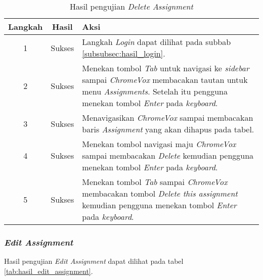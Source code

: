 \begin{table}[H]
	\centering
	\caption{Hasil pengujian \textit{Delete Assignment}}
	\label{tab:hasil_delete_assignment}
	\begin{tabular}{|c|c|p{12cm}|}
		\toprule
		Langkah & Hasil & Aksi\\
		\midrule
		1 & Sukses & Langkah \textit{Login} dapat dilihat pada subbab \ref{subsubsec:hasil_login}.\\
		2 & Sukses & Menekan tombol \textit{Tab} untuk navigasi ke \textit{sidebar} sampai \textit{ChromeVox} membacakan tautan untuk menu \textit{Assignments}. Setelah itu pengguna menekan tombol \textit{Enter} pada \textit{keyboard}.\\
		3 & Sukses & Menavigasikan \textit{ChromeVox} sampai membacakan baris \textit{Assignment} yang akan dihapus pada tabel.\\
		4 & Sukses & Menekan tombol navigasi maju \textit{ChromeVox} sampai membacakan \textit{Delete} kemudian pengguna menekan tombol \textit{Enter} pada \textit{keyboard}.\\
		5 & Sukses & Menekan tombol \textit{Tab} sampai \textit{ChromeVox} membacakan tombol \textit{Delete this assignment} kemudian pengguna menekan tombol \textit{Enter} pada \textit{keyboard}.\\
		\bottomrule
	\end{tabular}
\end{table}

\subsubsection{\textit{Edit Assignment}}
\label{subsubsec:hasil_edit_assignment}
Hasil pengujian \textit{Edit Assignment} dapat dilihat pada tabel \ref{tab:hasil_edit_assignment}.

